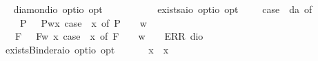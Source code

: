\begin{isabellebody}
\ \isamarkupfalse%
\ diamond{\isacharcolon}{\isacharcolon}{\isachardoublequoteopen}io\ opt{\isasymRightarrow}io\ opt{\isachardoublequoteclose}\ {\isacharparenleft}{\isachardoublequoteopen}\isactrlbold {\isasymdiamond}\ {\isacharunderscore}{\isachardoublequoteclose}\ {\isacharbrackleft}{}{}{\isacharbrackright}\ {}{}{\isacharparenright}\ \ {\isachardoublequoteopen}\isactrlbold {\isasymdiamond}{\isasymphi}\ {\isasymequiv}\ \isactrlbold {\isasymnot}\isactrlbold {\isasymbox}{\isacharparenleft}\isactrlbold {\isasymnot}{\isasymphi}{\isacharparenright}{\isachardoublequoteclose}\isanewline
\ \isamarkupfalse%
\ exists{\isacharcolon}{\isacharcolon}{\isachardoublequoteopen}{\isacharparenleft}{\isacharprime}a{\isasymRightarrow}io\ opt{\isacharparenright}{\isasymRightarrow}io\ opt{\isachardoublequoteclose}\ {\isacharparenleft}{\isachardoublequoteopen}\isactrlbold {\isasymexists}{\isachardoublequoteclose}{\isacharparenright}\ \ {\isachardoublequoteopen}\isactrlbold {\isasymexists}{\isasymPhi}\ {\isasymequiv}\ case\ {\isacharparenleft}{\isasymPhi}\ da{\isacharparenright}\ of\isanewline
\ \ \ \ P\ {\isasymphi}\ {\isasymRightarrow}\ P{\isacharparenleft}{\isasymlambda}w{\isachardot}{\isasymexists}x{\isachardot}\ case\ {\isacharparenleft}{\isasymPhi}\ x{\isacharparenright}\ of\ P\ {\isasympsi}\ {\isasymRightarrow}\ {\isasympsi}\ w{\isacharparenright}\ \isanewline
\ \ {\isacharbar}\ F\ {\isasymphi}\ {\isasymRightarrow}\ F{\isacharparenleft}{\isasymlambda}w{\isachardot}\ {\isasymexists}x{\isachardot}\ case\ {\isacharparenleft}{\isasymPhi}\ x{\isacharparenright}\ of\ F\ {\isasympsi}\ {\isasymRightarrow}\ {\isasympsi}\ w{\isacharparenright}\ {\isacharbar}\ {\isacharunderscore}\ {\isasymRightarrow}\ ERR\ dio{\isachardoublequoteclose}\ \isanewline
\ \isamarkupfalse%
\ existsBinder{\isacharcolon}{\isacharcolon}{\isachardoublequoteopen}{\isacharparenleft}{\isacharprime}a{\isasymRightarrow}io\ opt{\isacharparenright}{\isasymRightarrow}io\ opt{\isachardoublequoteclose}\ {\isacharparenleft}\ {\isachardoublequoteopen}\isactrlbold {\isasymexists}{\isachardoublequoteclose}\ {\isacharbrackleft}{}{\isacharbrackright}\ {}{\isacharparenright}\ \ \ {\isachardoublequoteopen}\isactrlbold {\isasymexists}x{\isachardot}\ {\isasymphi}\ x\ {\isasymequiv}\ \isactrlbold {\isasymexists}{\isasymphi}{\isachardoublequoteclose}%
\isamarkuptrue%
%
\begin{isamarkuptext}%

\end{isamarkuptext}
\end{isabellebody}
